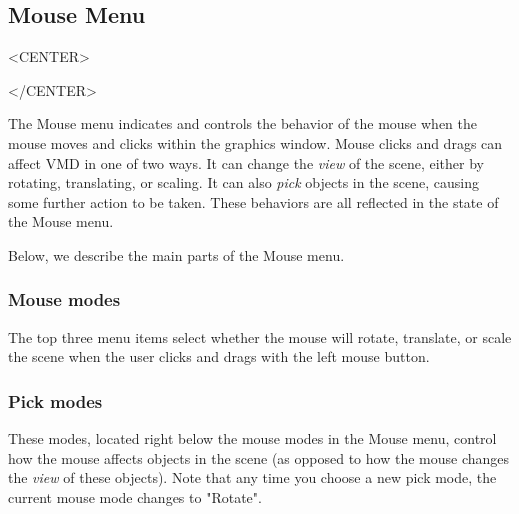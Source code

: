 
\subsection{Mouse Menu}
\label{ug:ui:window:mouse}

\begin{rawhtml}
<CENTER>
\end{rawhtml}
\begin{rawhtml}
</CENTER>
\end{rawhtml}

The {\sf Mouse} menu indicates and controls the behavior of the mouse
when the mouse moves and clicks within the graphics window.  Mouse clicks
and drags can affect VMD in one of two ways.  It can change the {\em view}
of the scene, either by rotating, translating, or scaling.  It can also
{\em pick} objects in the scene, causing some further action to be taken.
These behaviors are all reflected in the state of the Mouse menu.  
            
Below, we describe the main parts of the Mouse menu.

\subsubsection{Mouse modes}

The top three menu items select whether the mouse will 
rotate, translate, or scale the scene
when the user clicks and drags with the left mouse button.  

\subsubsection{Pick modes}

These modes, located right below the mouse modes in the Mouse menu, 
control how the mouse affects objects in the scene (as opposed
to how the mouse changes the {\em view} of these objects).  Note that
any time you choose a new pick mode, the current mouse mode changes to "Rotate".  

